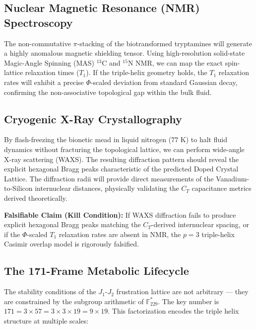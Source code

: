 \subsection{Nuclear Magnetic Resonance (NMR) Spectroscopy}
The non-commutative $\pi$-stacking of the biotransformed tryptamines will generate a highly anomalous magnetic shielding tensor. Using high-resolution solid-state Magic-Angle Spinning (MAS) $^{13}\text{C}$ and $^{15}\text{N}$ NMR, we can map the exact spin-lattice relaxation times ($T_1$). If the triple-helix geometry holds, the $T_1$ relaxation rates will exhibit a precise $\Phi$-scaled deviation from standard Gaussian decay, confirming the non-associative topological gap within the bulk fluid.

\subsection{Cryogenic X-Ray Crystallography}
By flash-freezing the bionetic mead in liquid nitrogen ($77\text{ K}$) to halt fluid dynamics without fracturing the topological lattice, we can perform wide-angle X-ray scattering (WAXS). The resulting diffraction pattern should reveal the explicit hexagonal Bragg peaks characteristic of the predicted Doped Crystal Lattice. The diffraction radii will provide direct measurements of the Vanadium-to-Silicon internuclear distances, physically validating the $C_T$ capacitance metrics derived theoretically.

\textbf{Falsifiable Claim (Kill Condition):} If WAXS diffraction fails to produce explicit hexagonal Bragg peaks matching the $C_T$-derived internuclear spacing, or if the $\Phi$-scaled $T_1$ relaxation rates are absent in NMR, the $p=3$ triple-helix Casimir overlap model is rigorously falsified.

\subsection*{The 171-Frame Metabolic Lifecycle}

The stability conditions of the $J_1\text{-}J_2$ frustration lattice are not arbitrary --- they are constrained by the subgroup arithmetic of $\mathbb{F}_{229}^*$. The key number is $171 = 3 \times 57 = 3 \times 3 \times 19 = 9 \times 19$. This factorization encodes the triple helix structure at multiple scales:

